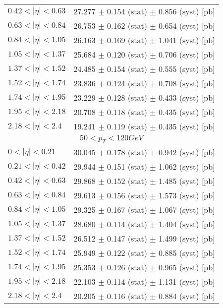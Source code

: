 \begin{tabular}{lc}
$0.42 < |\eta| <0.63$          & 27.277 $\pm$ 0.154 (stat) $\pm$ 0.856 (syst) [pb]  \\
$0.63 < |\eta| <0.84$          & 26.753 $\pm$ 0.162 (stat) $\pm$ 0.654 (syst) [pb]  \\
$0.84 < |\eta| <1.05$          & 26.163 $\pm$ 0.169 (stat) $\pm$ 1.041 (syst) [pb]  \\
$1.05 < |\eta| <1.37$          & 25.684 $\pm$ 0.120 (stat) $\pm$ 0.706 (syst) [pb]  \\
$1.37 < |\eta| <1.52$          & 24.485 $\pm$ 0.154 (stat) $\pm$ 0.555 (syst) [pb]  \\
$1.52 < |\eta| <1.74$          & 23.836 $\pm$ 0.124 (stat) $\pm$ 0.708 (syst) [pb]  \\
$1.74 < |\eta| <1.95$          & 23.229 $\pm$ 0.128 (stat) $\pm$ 0.433 (syst) [pb]  \\
$1.95 < |\eta| <2.18$          & 20.708 $\pm$ 0.118 (stat) $\pm$ 0.435 (syst) [pb]  \\
$2.18 < |\eta| <2.4$           & 19.241 $\pm$ 0.119 (stat) $\pm$ 0.435 (syst) [pb]  \\
\hline
\multicolumn{2}{c}{$50 < p_{T} < 120 GeV$} \\
\hline
$0 < |\eta| <0.21$             & 30.045 $\pm$ 0.178 (stat) $\pm$ 0.942 (syst) [pb]  \\
$0.21 < |\eta| <0.42$          & 29.944 $\pm$ 0.151 (stat) $\pm$ 1.062 (syst) [pb]  \\
$0.42 < |\eta| <0.63$          & 29.868 $\pm$ 0.152 (stat) $\pm$ 1.485 (syst) [pb]  \\
$0.63 < |\eta| <0.84$          & 29.613 $\pm$ 0.156 (stat) $\pm$ 1.573 (syst) [pb]  \\
$0.84 < |\eta| <1.05$          & 29.325 $\pm$ 0.167 (stat) $\pm$ 1.067 (syst) [pb]  \\
$1.05 < |\eta| <1.37$          & 28.680 $\pm$ 0.114 (stat) $\pm$ 1.404 (syst) [pb]  \\
$1.37 < |\eta| <1.52$          & 26.512 $\pm$ 0.147 (stat) $\pm$ 1.499 (syst) [pb]  \\
$1.52 < |\eta| <1.74$          & 25.949 $\pm$ 0.122 (stat) $\pm$ 0.885 (syst) [pb]  \\
$1.74 < |\eta| <1.95$          & 25.353 $\pm$ 0.126 (stat) $\pm$ 0.965 (syst) [pb]  \\
$1.95 < |\eta| <2.18$          & 22.103 $\pm$ 0.114 (stat) $\pm$ 1.131 (syst) [pb]  \\
$2.18 < |\eta| <2.4$           & 20.205 $\pm$ 0.116 (stat) $\pm$ 0.884 (syst) [pb]  \\
\hline
\end{tabular}
